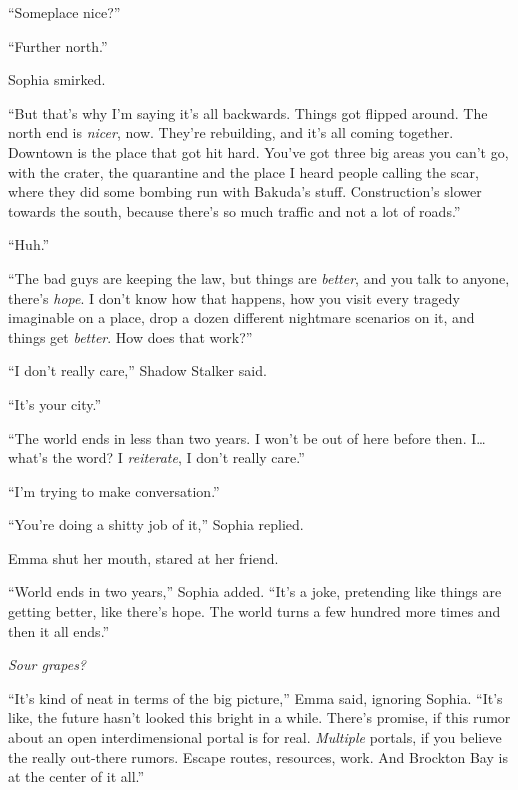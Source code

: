 ``Someplace nice?''



``Further north.''



Sophia smirked.



``But that's why I'm saying it's all backwards.  Things got flipped around.  The north end is \emph{nicer}, now.  They're rebuilding, and it's all coming together.  Downtown is the place that got hit hard.  You've got three big areas you can't go, with the crater, the quarantine and the place I heard people calling the scar, where they did some bombing run with Bakuda's stuff.  Construction's slower towards the south, because there's so much traffic and not a lot of roads.''



``Huh.''



``The bad guys are keeping the law, but things are \emph{better}, and you talk to anyone, there's \emph{hope}.  I don't know how that happens, how you visit every tragedy imaginable on a place, drop a dozen different nightmare scenarios on it, and things get \emph{better}.  How does that work?''



``I don't really care,'' Shadow Stalker said.



``It's your city.''



``The world ends in less than two years.  I won't be out of here before then.  I\ldots what's the word?  I \emph{reiterate}, I don't really care.''



``I'm trying to make conversation.''



``You're doing a shitty job of it,'' Sophia replied.



Emma shut her mouth, stared at her friend.



``World ends in two years,'' Sophia added.  ``It's a joke, pretending like things are getting better, like there's hope.  The world turns a few hundred more times and then it all ends.''



\emph{Sour grapes?}



``It's kind of neat in terms of the big picture,'' Emma said, ignoring Sophia.  ``It's like, the future hasn't looked this bright in a while.  There's promise, if this rumor about an open interdimensional portal is for real.  \emph{Multiple} portals, if you believe the really out-there rumors.  Escape routes, resources, work.  And Brockton Bay is at the center of it all.''



